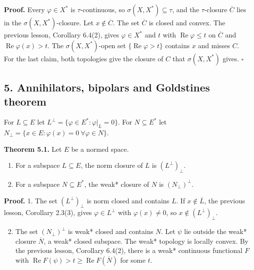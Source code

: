 \documentclass[
  english,
  11pt,
  a4paper,
]{article}
\providecommand{\tightlist}{%
  \setlength{\itemsep}{0pt}\setlength{\parskip}{0pt}}
\begin{document}
\textbf{Proof.} Every \(\varphi\in X^*\) is \(\tau\)-continuous, so
\(\sigma(X,X^*)\subseteq\tau\), and the \(\tau\)-closure \(\overline C\)
lies in the \(\sigma(X,X^*)\)-closure. Let \(x\notin\overline C\). The
set \(\overline C\) is closed and convex. The previous lesson, Corollary
6.4(2), gives \(\varphi\in X^*\) and \(t\) with
\(\operatorname{Re}\varphi\le t\) on \(\overline C\) and
\(\operatorname{Re}\varphi(x)>t\). The \(\sigma(X,X^*)\)-open set
\(\{\operatorname{Re}\varphi>t\}\) contains \(x\) and misses \(C\). For
the last claim, both topologies give the closure of \(C\) that
\(\sigma(X,X^*)\) gives. \(\square\)

\subsection[5. Annihilators, bipolars and Goldstine\textquotesingle s
theorem]{\texorpdfstring{\protect\hypertarget{weak-topologies-tychonoff-banach-alaoglu-mazur-bipolars-krein-milman-and-eberlein-smulian--oa-fnd-wt-05}{}{}5.
Annihilators, bipolars and Goldstine\textquotesingle s
theorem}{5. Annihilators, bipolars and Goldstine\textquotesingle s theorem}}\label{weak-topologies-tychonoff-banach-alaoglu-mazur-bipolars-krein-milman-and-eberlein-smulian--OA-FND-WT-05}

For \(L\subseteq E\) let \(L^\perp=\{\varphi\in E^*:\varphi|_L=0\}\).
For \(N\subseteq E^*\) let
\(N_\perp=\{x\in E:\varphi(x)=0\ \forall\varphi\in N\}\).

\textbf{Theorem 5.1.} Let \(E\) be a normed space.

\begin{enumerate}
\tightlist
\item
  For a subspace \(L\subseteq E\), the norm closure of \(L\) is
  \((L^\perp)_\perp\).
\item
  For a subspace \(N\subseteq E^*\), the weak* closure of \(N\) is
  \((N_\perp)^\perp\).
\end{enumerate}

\textbf{Proof.} 1. The set \((L^\perp)_\perp\) is norm closed and
contains \(L\). If \(x\notin\overline L\), the previous lesson,
Corollary 2.3(3), gives \(\varphi\in L^\perp\) with \(\varphi(x)\ne0\),
so \(x\notin(L^\perp)_\perp\).

\begin{enumerate}
\setcounter{enumi}{1}
\tightlist
\item
  The set \((N_\perp)^\perp\) is weak* closed and contains \(N\). Let
  \(\psi\) lie outside the weak* closure \(\overline N\), a weak* closed
  subspace. The weak* topology is locally convex. By the previous
  lesson, Corollary 6.4(2), there is a weak* continuous functional \(F\)
  with \(\operatorname{Re}F(\psi)>t\ge\operatorname{Re}F(\overline N)\)
  for some \(t\).
\end{enumerate}
\end{document}
